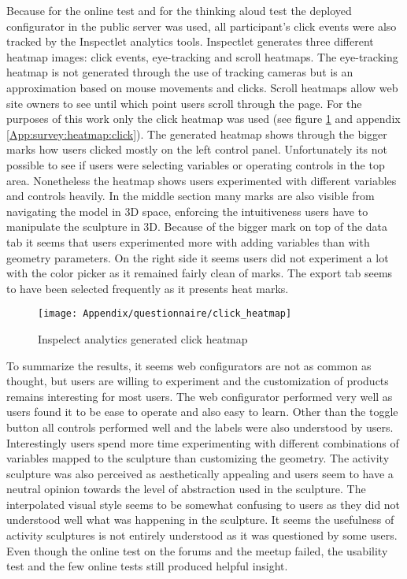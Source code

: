 \documentclass[../medieninformatik-arbeit.tex]{subfiles}
\begin{document}
Because for the online test and for the thinking aloud test the deployed configurator in the public server was used, all participant's click events were also tracked by the Inspectlet analytics tools. Inspectlet generates three different heatmap images: click events, eye-tracking and scroll heatmaps. The eye-tracking heatmap is not generated through the use of tracking cameras but is an approximation based on mouse movements and clicks. Scroll heatmaps allow web site owners to see until which point users scroll through the page. For the purposes of this work only the click heatmap was used (see figure \ref{fig:heatmap} and appendix \ref{App:survey:heatmap:click}). The generated heatmap shows through the bigger marks how users clicked mostly on the left control panel. Unfortunately its not possible to see if users were selecting variables or operating controls in the top area. Nonetheless the heatmap shows users experimented with different variables and controls heavily. In the middle section many marks are also visible from navigating the model in 3D space, enforcing the intuitiveness users have to manipulate the sculpture in 3D. Because of the bigger mark on top of the data tab it seems that users experimented more with adding variables than with geometry parameters. On the right side it seems users did not experiment a lot with the color picker as it remained fairly clean of marks. The export tab seems to have been selected frequently as it presents heat marks.

\begin{figure}[h]
\captionsetup{width=\textwidth}
\begin{center}
  \texttt{[image: Appendix/questionnaire/click\_heatmap]}
  \caption{Inspelect analytics generated click heatmap}
\label{fig:heatmap}
\end{center}
\end{figure}

To summarize the results, it seems web configurators are not as common as thought, but users are willing to experiment and the customization of products remains interesting for most users. The web configurator performed very well as users found it to be ease to operate and also easy to learn. Other than the toggle button all controls performed well and the labels were also understood by users. Interestingly users spend more time experimenting with different combinations of variables mapped to the sculpture than customizing the geometry. The activity sculpture was also perceived as aesthetically appealing and users seem to have a neutral opinion towards the level of abstraction used in the sculpture. The interpolated visual style seems to be somewhat confusing to users as they did not understood well what was happening in the sculpture. It seems the usefulness of activity sculptures is not entirely understood as it was questioned by some users. Even though the online test on the forums and the meetup failed, the usability test and the few online tests still produced helpful insight. 
\end{document}
